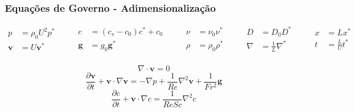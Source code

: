 \begin{frame} 
 \frametitle{\Large Equações de Governo - Adimensionalização}
\vspace{-1cm}
\scriptsize
\begin{equation*}
 \begin{aligned}
  p & = \rho_{0} U^{2} p^{*} \\[10pt]
 \textbf{v} & = U \textbf{v}^{*} \\
 \end{aligned}
 \qquad
 \begin{aligned}
 c & = ( c_{s} - c_{0} ) c^{*} + c_{0}\\[10pt]
 \textbf{g} & = g_{0} \textbf{g}^{*} \\
 \end{aligned}
 \qquad
 \begin{aligned}
 \nu & = \nu_{0} \nu^{*} \\[10pt]
 \rho & = \rho_{0} \rho^{*} \\
 \end{aligned}
 \qquad
 \begin{aligned}
 D & = D_{0} D^{*} \\[5pt]
 \nabla & = \frac{1}{L} \nabla^{*} \\
 \end{aligned}
 \qquad
 \begin{aligned}
 x & = L x^{*} \\[5pt]
 t & = \frac{L}{U} t^{*} \\
 \end{aligned}
 \nonumber
\end{equation*}

\small
\vspace{1cm}
\begin{equation*}
 \nabla \cdot \textbf{v} = 0
\end{equation*}
\vspace{0.3cm}
\begin{equation*}
 \frac{\partial \textbf{v}}{\partial t} 
 + 
 \textbf{v} \cdot \nabla \textbf{v}
 =
 -
 \nabla p
 +
 \frac{1}{Re} \nabla^{2} \textbf{v}
 +
 \frac{1}{Fr^{2}} \textbf{g}
\end{equation*}
\vspace{0.3cm}
\begin{equation*}
 \frac{\partial c}{\partial t}
 +
 \textbf{v} \cdot \nabla c
 =
 \frac{1}{ReSc} \nabla^{2} c
\end{equation*}
\end{frame}


